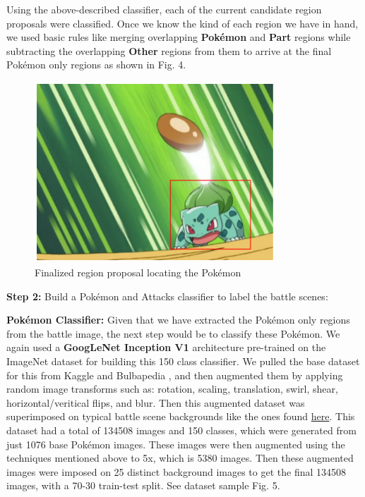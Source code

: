 \documentclass[journal, a4paper]{IEEEtran}
\begin{document}
Using the above-described classifier, each of the current candidate region proposals were classified. Once we know the kind of each region we have in hand, we used basic rules like merging overlapping \textbf{Pok\'emon} and \textbf{Part} regions while subtracting the overlapping \textbf{Other} regions from them to arrive at the final Pok\'emon only regions as shown in Fig. 4.

\begin{figure}[ht]
    \caption{Finalized region proposal locating the Pok\'emon}
\centering
 \includegraphics[scale = 0.6, width=9cm]{ppo2.png}
    \end{figure}

\textbf{Step 2:} Build a Pok\'emon and Attacks classifier to label the battle scenes:

\textbf{Pok\'emon Classifier:} Given that we have extracted the Pok\'emon only regions from the battle image, the next step would be to classify these Pok\'emon. We again used a \textbf{GoogLeNet Inception V1} architecture pre-trained on the ImageNet dataset for building this 150 class classifier. We pulled the base dataset for this from Kaggle \cite{KAGGLE} and Bulbapedia \cite{BULBAPEDIA}, and then augmented them by applying random image transforms such as: rotation, scaling, translation, swirl, shear, horizontal/veritical flips, and blur. Then this augmented dataset was superimposed on typical battle scene backgrounds like the ones found \href{https://drive.google.com/drive/folders/1LhRDXpVSsk9nHymrT8Dy9LQcLmGcC546}{here}. This dataset had a total of 134508 images and 150 classes, which were generated from just 1076 base Pok\'emon images. These images were then augmented using the techniques mentioned above to 5x, which is 5380 images. Then these augmented images were imposed on 25 distinct background images to get the final 134508 images, with a 70-30 train-test split. See dataset sample Fig. 5.
\end{document}
